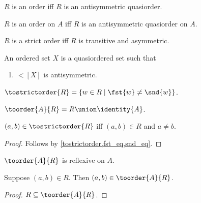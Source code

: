 \begin{abbreviation}\label{order}
    $R$ is an order iff
        $R$ is an antisymmetric quasiorder.
\end{abbreviation}

\begin{abbreviation}\label{order_on}
    $R$ is an order on $A$ iff
        $R$ is an antisymmetric quasiorder on $A$.
\end{abbreviation}

\begin{abbreviation}\label{strictorder}
    $R$ is a strict order iff
        $R$ is transitive and asymmetric.
\end{abbreviation}

\begin{struct}\label{orderedset}
    An ordered set $X$ is a quasiordered set
    such that
    \begin{enumerate}
        \item\label{orderedset_antisym} $\lt[X]$ is antisymmetric.
    \end{enumerate}
\end{struct}

\begin{definition}\label{tostrictorder}
    $\tostrictorder{R} = \{w\in R\mid \fst{w}\neq\snd{w}\}$.
\end{definition}

\begin{definition}\label{toorder}
    $\toorder{A}{R} = R\union\identity{A}$.
\end{definition}

\begin{proposition}\label{tostrictorder_iff}
    $(a,b)\in\tostrictorder{R}$ iff $(a,b)\in R$ and $a\neq b$.
\end{proposition}
\begin{proof}
    Follows by \cref{tostrictorder,fst_eq,snd_eq}.
\end{proof}

\begin{proposition}\label{toorder_reflexive}
    $\toorder{A}{R}$ is reflexive on $A$.
\end{proposition}

\begin{proposition}\label{toorder_intro}
    Suppose $(a,b)\in R$.
    Then $(a,b)\in\toorder{A}{R}$.
\end{proposition}
\begin{proof}
    $R\subseteq\toorder{A}{R}$.
\end{proof}

